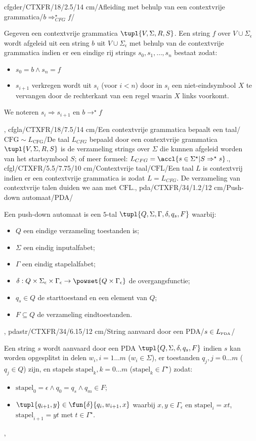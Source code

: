 cfgder/CTXFR/18/2.5/14 cm/Afleiding met behulp van een contextvrije grammatica/$b\Rightarrow_{CFG}^{\star}f$/{Gegeven een contextvrije grammatica $\tupl{V,\Sigma,R,S}$. Een string $f$ over $V\cup\Sigma_{\epsilon}$ wordt afgeleid uit een string $b$ uit $V\cup\Sigma_{\epsilon}$ met behulp van de contextvrije grammatica indien er een eindige rij strings $s_0,s_1,\ldots,s_n$ bestaat zodat:\begin{itemize}
 \item $s_0=b\wedge s_n=f$
 \item $s_{i+1}$ verkregen wordt uit $s_i$ (voor $i<n$) door in $s_i$ een niet-eindsymbool $X$ te vervangen door de rechterkant van een regel waarin $X$ links voorkomt.
\end{itemize}
We noteren $s_i\Rightarrow s_{i+1}$ en $b\rightarrow^{\star}f$},
cfgla/CTXFR/18/7.5/14 cm/Een contextvrije grammatica bepaalt een taal/$\mbox{CFG}\sim L_{\mbox{CFG}}$/{De taal $L_{CFG}$ bepaald door een contextvrije grammatica $\tupl{V,\Sigma,R,S}$ is de verzameling strings over $\Sigma$ die kunnen afgeleid worden van het startsymbool $S$; of meer formeel: $L_{CFG}=\accl{s\in\Sigma^{\star}|S\Rightarrow^{\star}s}$.},
cfgl/CTXFR/5.5/7.75/10 cm/Contextvrije taal/$\mbox{CFL}$/{Een taal $L$ is contextvrij indien er een contextvrije grammatica is zodat $L=L_{CFG}$. De verzameling van contextvrije talen duiden we aan met $\mbox{CFL}$.},
pda/CTXFR/34/1.2/12 cm/Push-down automaat/PDA/{Een push-down automaat is een $5$-tal $\tupl{Q,\Sigma,\Gamma,\delta,q_s,F}$ waarbij:\begin{itemize}
 \item $Q$ een eindige verzameling toestanden is;
 \item $\Sigma$ een eindig inputalfabet;
 \item $\Gamma$ een eindig stapelalfabet;
 \item $\delta:Q\times\Sigma_{\epsilon}\times\Gamma_{\epsilon}\rightarrow\powset{Q\times\Gamma_{\epsilon}}$ de overgangsfunctie;
 \item $q_s\in Q$ de starttoestand en een element van $Q$;
 \item $F\subseteq Q$ de verzameling eindtoestanden.
\end{itemize}},
pdastr/CTXFR/34/6.15/12 cm/String aanvaard door een PDA/$s\in L_{\mbox{\tiny PDA}}$/{Een string $s$ wordt aanvaard door een PDA $\tupl{Q,\Sigma,\delta,q_s,F}$ indien $s$ kan worden opgesplitst in delen $w_i,i=1\ldots m$ ($w_i\in\Sigma$), er toestanden $q_j,j=0\ldots m$ ($q_j\in Q$) zijn, en stapels $\mbox{stapel}_k,k=0\ldots m$ ($\mbox{stapel}_k\in\Gamma^{\star}$) zodat:\begin{itemize}\item $\mbox{stapel}_0=\epsilon\wedge q_0=q_s\wedge q_m\in F$;\item $\tupl{q_{i+1},y}\in\fun{\delta}{q_i,w_{i+1},x}$ waarbij $x,y\in\Gamma_{\epsilon}$ en $\mbox{stapel}_i=xt$, $\mbox{stapel}_{i+1}=yt$ met $t\in\Gamma^{\star}$.\end{itemize}},

